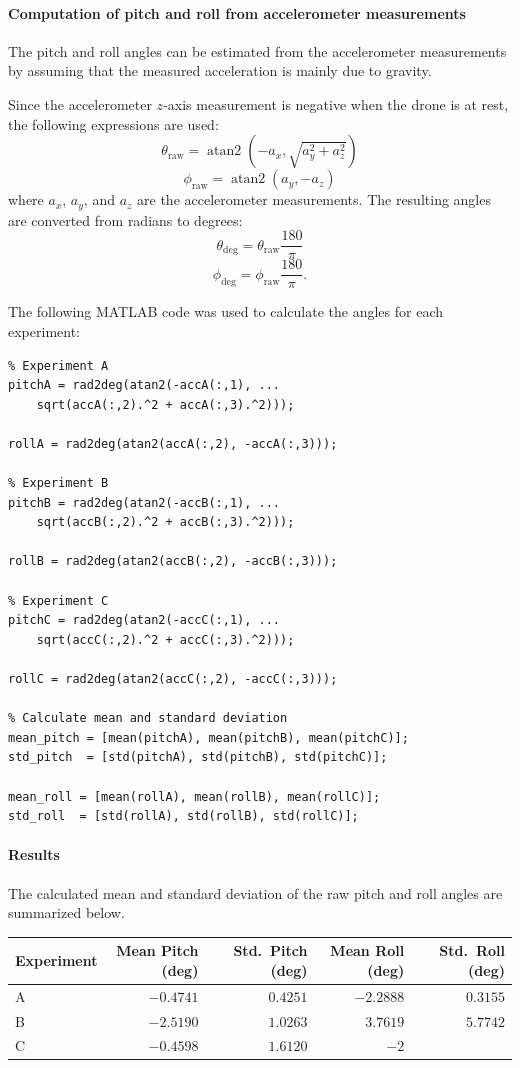 \documentclass[10pt,a4paper]{article}
\newenvironment{answer}{%
  \begin{tcolorbox}[breakable,enhanced,colback=white,colframe=greyline,
    boxrule=0.6pt,arc=2pt,left=8pt,right=8pt,top=7pt,bottom=7pt,
    before skip=0pt,after skip=12pt]
}{\end{tcolorbox}}
\begin{document}
\begin{answer}
\paragraph{Computation of pitch and roll from accelerometer measurements}
The pitch and roll angles can be estimated from the accelerometer measurements by assuming that the measured acceleration is mainly due to gravity.

Since the accelerometer \(z\)-axis measurement is negative when the drone is at rest, the following expressions are used:
\[
\theta_{\mathrm{raw}} =
\operatorname{atan2}
\left(
-a_x,\sqrt{a_y^2+a_z^2}
\right)
\]
\[
\phi_{\mathrm{raw}} =
\operatorname{atan2}(a_y,-a_z)
\]
where \(a_x\), \(a_y\), and \(a_z\) are the accelerometer measurements. The resulting angles are converted from radians to degrees:
\[
\theta_{\mathrm{deg}}=
\theta_{\mathrm{raw}}\frac{180}{\pi}
\]
\[
\phi_{\mathrm{deg}}=
\phi_{\mathrm{raw}}\frac{180}{\pi}.
\]

The following MATLAB code was used to calculate the angles for each experiment:

\begin{lstlisting}
% Experiment A
pitchA = rad2deg(atan2(-accA(:,1), ...
    sqrt(accA(:,2).^2 + accA(:,3).^2)));

rollA = rad2deg(atan2(accA(:,2), -accA(:,3)));

% Experiment B
pitchB = rad2deg(atan2(-accB(:,1), ...
    sqrt(accB(:,2).^2 + accB(:,3).^2)));

rollB = rad2deg(atan2(accB(:,2), -accB(:,3)));

% Experiment C
pitchC = rad2deg(atan2(-accC(:,1), ...
    sqrt(accC(:,2).^2 + accC(:,3).^2)));

rollC = rad2deg(atan2(accC(:,2), -accC(:,3)));

% Calculate mean and standard deviation
mean_pitch = [mean(pitchA), mean(pitchB), mean(pitchC)];
std_pitch  = [std(pitchA), std(pitchB), std(pitchC)];

mean_roll = [mean(rollA), mean(rollB), mean(rollC)];
std_roll  = [std(rollA), std(rollB), std(rollC)];
\end{lstlisting}

\paragraph{Results}
The calculated mean and standard deviation of the raw pitch and roll angles are summarized below.

\begin{center}
\begin{tabular}{@{}lrrrr@{}}
\toprule
Experiment & Mean Pitch (deg) & Std.\ Pitch (deg) & Mean Roll (deg) & Std.\ Roll (deg) \\
\midrule
A & $-0.4741$ & $0.4251$ & $-2.2888$ & $0.3155$ \\
B & $-2.5190$ & $1.0263$ & $3.7619$  & $5.7742$ \\
C & $-0.4598$ & $1.6120$ & $-2$      & \\
\bottomrule
\end{tabular}
\end{center}
\end{answer}
\end{document}
